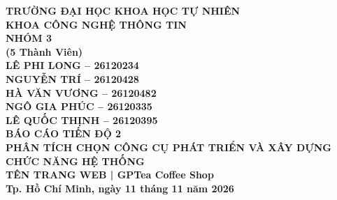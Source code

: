 \documentclass[a4paper,12pt]{report}
\numberwithin{equation}{chapter}
\newcommand{\chuongkhongso}[1]{\clearpage\phantomsection\chapter*{#1}\addcontentsline{toc}{chapter}{#1}}
\newcommand{\chuongkhongmucluc}[1]{\clearpage\phantomsection\chapter*{#1}}
\begin{document}
\begin{titlepage}
\centering
\bfseries
{\large TRƯỜNG ĐẠI HỌC KHOA HỌC TỰ NHIÊN\\[2pt]
KHOA CÔNG NGHỆ THÔNG TIN}\\[2.5cm]
{\large NHÓM 3}\\[0.5cm]
{\large (5 Thành Viên)}\\[4pt]
{\large LÊ PHI LONG -- 26120234\\[4pt]
NGUYỄN TRÍ -- 26120428\\[4pt]
HÀ VĂN VƯƠNG -- 26120482\\[4pt]
NGÔ GIA PHÚC -- 26120335\\[4pt]
LÊ QUỐC THỊNH -- 26120395}\\[2cm]
{\Large BÁO CÁO TIẾN ĐỘ 2\\[8pt]
PHÂN TÍCH CHỌN CÔNG CỤ PHÁT TRIỂN VÀ XÂY DỰNG CHỨC NĂNG HỆ THỐNG \\[4pt]
TÊN TRANG WEB | GPTea Coffee Shop}\\[2.5cm]  %
\vfill
{\large Tp. Hồ Chí Minh, ngày 11 tháng 11 năm 2026}  %
\end{titlepage}

\setcounter{page}{1}






\end{document}
